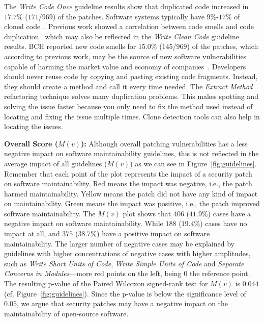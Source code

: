 \documentclass[smallextended]{svjour3}       %
\begin{document}
The \emph{Write Code Once} guideline results show that duplicated 
code increased in $17.7\%$ ($171$/$969$) of the patches. Software systems typically have $9\%$-$17\%$ of cloned code~\cite{5773403}. Previous work showed a correlation between code smells and code
duplication~\cite{7476787} which may also be reflected in the 
\emph{Write Clean Code} guideline results. BCH reported new code 
smells for $15.0\%$ ($145$/$969$) of the patches, which according to previous work, 
may be the source of new software vulnerabilities~\cite{8819456,10.1145/3133956.3134072}
capable of harming the market value and economy of companies~\cite{4267025}.
Developers should never reuse code by copying and pasting 
existing code fragments. Instead, they should create a method and call 
it every time needed. The \emph{Extract Method} refactoring 
technique solves many duplication problems. This makes spotting and solving the issue faster because you only need to fix the method used
instead of locating and fixing the issue multiple times.
Clone detection tools can also help in locating the issues.

\textbf{Overall Score ($M(v)$):} 
Although overall patching vulnerabilities has a less negative impact
on software maintainability guidelines, this is not reflected in the 
average impact of all guidelines ($M(v)$) as we can see in 
Figure~\ref{fig:guidelines}. Remember that each point of the plot 
represents the impact of a security patch on software 
maintainability. Red means the impact was negative, i.e., the patch 
harmed maintainability. Yellow means the patch did not have any kind of impact on maintainability. Green means the impact was positive, i.e., the patch improved software maintainability.
The $M(v)$ plot shows that $406$ ($41.9\%$) cases have a negative impact on software maintainability. While $188$ ($19.4\%$) cases 
have no impact at all, and $375$ ($38.7\%$) have a positive impact on 
software maintainability. The larger number of negative cases may be 
explained by guidelines with higher concentrations of negative 
cases with higher amplitudes, such as \emph{Write Short Units of 
Code}, \emph{Write Simple Units of Code} and \emph{Separate Concerns 
in Modules}---more red points on the left, being $0$ the reference point.
The resulting p-value of the Paired Wilcoxon signed-rank test for $M(v)$ 
is $0.044$ (cf. Figure~\ref{fig:guidelines}). Since the p-value is 
below the significance level of $0.05$, we argue that security patches 
may have a negative impact on the maintainability of open-source software.
\end{document}
